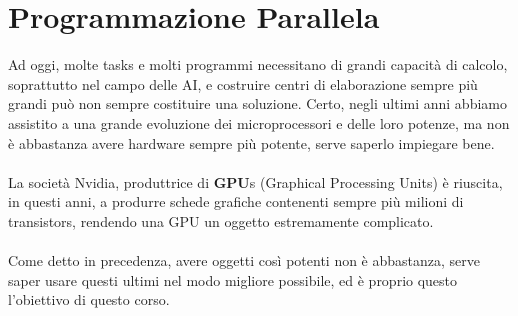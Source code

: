 \chapter{Programmazione Parallela}

Ad oggi, molte tasks e molti programmi necessitano di grandi capacità di calcolo, soprattutto nel campo delle AI, e costruire centri di elaborazione sempre più grandi può non sempre costituire una soluzione. Certo, negli ultimi anni abbiamo assistito a una grande evoluzione dei microprocessori e delle loro potenze, ma non è abbastanza avere hardware sempre più potente, serve saperlo impiegare bene.
\\\\
La società Nvidia, produttrice di \textbf{GPU}s (Graphical Processing Units) è riuscita, in questi anni, a produrre schede grafiche contenenti sempre più milioni di transistors, rendendo una GPU un oggetto estremamente complicato.
\\\\
Come detto in precedenza, avere oggetti così potenti non è abbastanza, serve saper usare questi ultimi nel modo migliore possibile, ed è proprio questo l'obiettivo di questo corso.